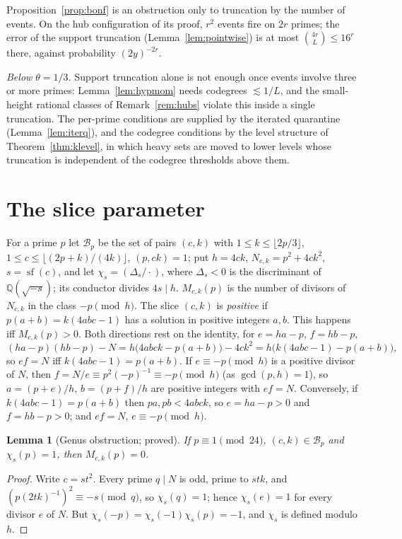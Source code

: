 \documentclass[11pt,reqno]{amsart}
\newtheorem{lemma}[theorem]{Lemma}
\theoremstyle{definition}
\newcommand{\sfree}{\operatorname{sf}}
\newcommand{\cB}{\mathcal B}
\begin{document}
Proposition~\ref{prop:bonf} is an obstruction only to truncation by the
number of events.  On the hub configuration of its proof, $r^2$ events fire on
$2r$ primes; the error of the support truncation (Lemma~\ref{lem:pointwise}) is
at most $\binom{4r}{L}\le16^r$ there, against probability $(2y)^{-2r}$.

\emph{Below $\theta=1/3$.}  Support truncation alone is not enough once
events involve three or more primes: Lemma~\ref{lem:hypmom} needs codegrees
$\lesssim1/L$, and the small-height rational classes of
Remark~\ref{rem:hubs} violate this inside a single truncation.  The per-prime
conditions are supplied by the iterated quarantine (Lemma~\ref{lem:iterq}),
and the codegree conditions by the level structure of
Theorem~\ref{thm:klevel}, in which heavy sets are moved to lower levels whose
truncation is independent of the codegree thresholds above them.

\section{The slice parameter}\label{sec:typeI}

For a prime $p$ let $\cB_p$ be the set of pairs $(c,k)$ with
$1\le k\le\lfloor2p/3\rfloor$, $1\le c\le\lfloor(2p+k)/(4k)\rfloor$, $(p,ck)=1$;
put $h=4ck$, $N_{c,k}=p^2+4ck^2$, $s=\sfree(c)$, and let $\chi_s=(\Delta_s/\cdot)$,
where $\Delta_s<0$ is the discriminant of $\mathbb Q(\sqrt{-s})$; its
conductor divides $4s\mid h$.  $M_{c,k}(p)$ is the number of divisors of
$N_{c,k}$ in the class $-p\pmod h$.  The slice $(c,k)$ is \emph{positive} if
$p(a+b)=k(4abc-1)$ has a solution in positive integers $a,b$.  This happens iff
$M_{c,k}(p)>0$.  Both directions rest on the identity, for $e=ha-p$, $f=hb-p$,
\[
 (ha-p)(hb-p)-N=h\big(4abck-p(a+b)\big)-4ck^2=h\big(k(4abc-1)-p(a+b)\big),
\]
so $ef=N$ iff $k(4abc-1)=p(a+b)$.  If $e\equiv-p\pmod h$ is a positive divisor
of $N$, then $f=N/e\equiv p^2(-p)^{-1}\equiv-p\pmod h$ (as $\gcd(p,h)=1$), so
$a=(p+e)/h$, $b=(p+f)/h$ are positive integers with $ef=N$.  Conversely, if
$k(4abc-1)=p(a+b)$ then $pa,pb<4abck$, so $e=ha-p>0$ and $f=hb-p>0$; and $ef=N$,
$e\equiv-p\pmod h$.

\begin{lemma}[Genus obstruction; proved]\label{lem:genus}
If $p\equiv1\pmod{24}$, $(c,k)\in\cB_p$ and $\chi_s(p)=1$, then $M_{c,k}(p)=0$.
\end{lemma}

\begin{proof}
Write $c=st^2$.  Every prime $q\mid N$ is odd, prime to $stk$, and
$(p(2tk)^{-1})^2\equiv-s\pmod q$, so $\chi_s(q)=1$; hence $\chi_s(e)=1$ for every
divisor $e$ of $N$.  But $\chi_s(-p)=\chi_s(-1)\chi_s(p)=-1$, and $\chi_s$ is
defined modulo $h$.
\end{proof}
\end{document}
